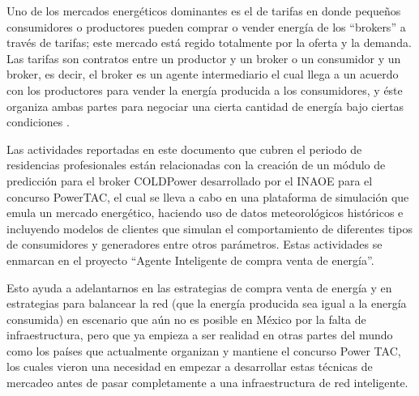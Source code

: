 Uno de los mercados energéticos dominantes es el de tarifas en donde pequeños consumidores o productores pueden comprar o vender energía de los ``brokers'' a través de tarifas; este mercado está regido totalmente por la oferta y la demanda.
Las tarifas son contratos entre un productor y un broker o un consumidor y un broker, es decir, el broker es un agente intermediario el cual llega a un acuerdo con los productores para vender la energía producida a los consumidores, y éste organiza ambas partes para negociar una cierta cantidad de energía bajo ciertas condiciones \cite{MPAlonsoAYRGonzalezDesarrolloDeTec}.

Las actividades reportadas en este documento que cubren el periodo de residencias profesionales están relacionadas con la creación de un módulo de predicción para el broker COLDPower desarrollado por el INAOE para el concurso PowerTAC, el cual se lleva a cabo en una plataforma de simulación que emula un mercado energético, haciendo uso de datos meteorológicos históricos e incluyendo modelos de clientes que simulan el comportamiento de diferentes tipos de consumidores y generadores entre otros parámetros. 
Estas actividades se enmarcan en el proyecto ``Agente Inteligente de compra venta de energía''.

Esto ayuda a adelantarnos en las estrategias de compra venta de energía y en estrategias para balancear la red (que la energía producida sea igual a la energía consumida) en escenario que aún no es posible en México por la falta de infraestructura, pero que ya empieza a ser realidad en otras partes del mundo como los países que actualmente organizan y mantiene el concurso Power TAC, los cuales vieron una necesidad en empezar a desarrollar estas técnicas de mercadeo antes de pasar completamente a una infraestructura de red inteligente.